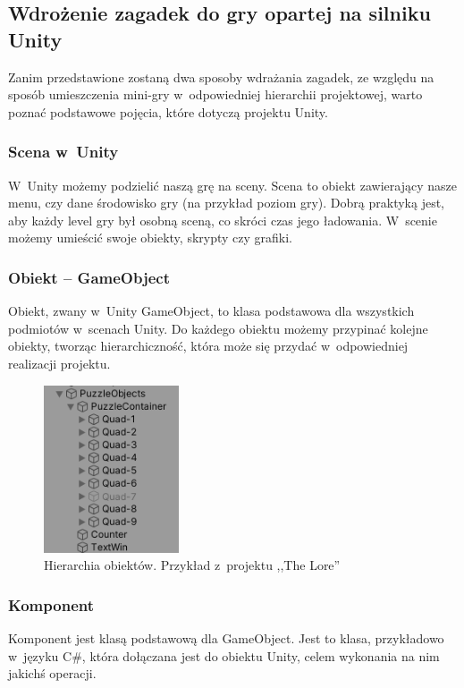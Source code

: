 \documentclass[oneside,polski,logo]{amuthesis}
\begin{document}
\subsection{Wdrożenie zagadek do gry opartej na silniku Unity}
\par Zanim przedstawione zostaną dwa sposoby wdrażania zagadek, ze względu na sposób umieszczenia mini-gry w~odpowiedniej hierarchii projektowej, warto poznać podstawowe pojęcia, które dotyczą projektu Unity.

\subsubsection{Scena w~Unity}
\par W~Unity możemy podzielić naszą grę na sceny. Scena to obiekt zawierający nasze menu, czy dane środowisko gry (na przykład poziom gry). Dobrą praktyką jest, aby każdy level gry był osobną sceną, co skróci czas jego ładowania. W~scenie możemy umieścić swoje obiekty, skrypty czy grafiki. \cite{scena}

\subsubsection{Obiekt – GameObject}
\label{sec:gameobject}
\par Obiekt, zwany w~Unity GameObject, to klasa podstawowa dla wszystkich podmiotów w~scenach Unity. Do każdego obiektu możemy przypinać kolejne obiekty, tworząc hierarchiczność, która może się przydać w~odpowiedniej realizacji projektu. \cite{gameobject}

\begin{figure}[h]
\centering
\includegraphics[width=4cm]{images/tyrek/hierarchia.png}
\caption{Hierarchia obiektów. Przykład z~projektu ,,The Lore''}
\end{figure}

\subsubsection{Komponent}
\label{sec:komponent}
\par Komponent jest klasą podstawową dla GameObject. Jest to klasa, przykładowo w~języku C\#, która dołączana jest do obiektu Unity, celem wykonania na nim jakichś operacji. \cite{komponent}
\end{document}
